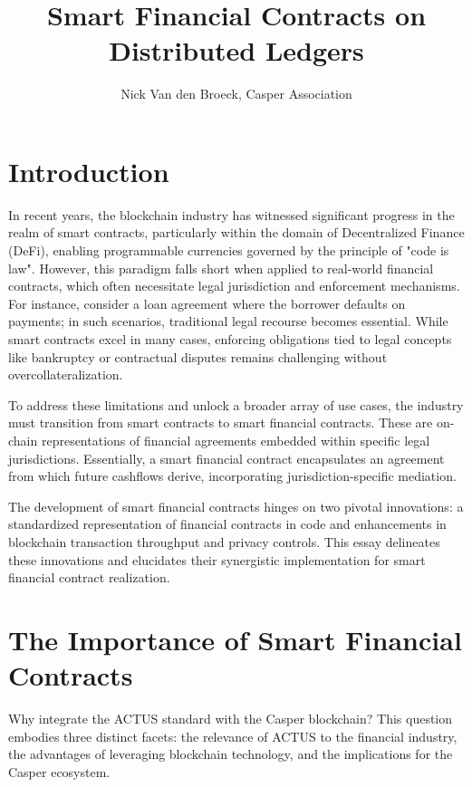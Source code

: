 \documentclass[12pt]{article}
\title{Smart Financial Contracts on Distributed Ledgers}
\author{Nick Van den Broeck, Casper Association}
\begin{document}
\vspace{-1cm}
\maketitle

\tableofcontents
\newpage

\section{Introduction}

In recent years, the blockchain industry has witnessed significant progress in
the realm of smart contracts, particularly within the domain of Decentralized
Finance (DeFi), enabling programmable currencies governed by the principle of
"code is law". However, this paradigm falls short when applied to real-world
financial contracts, which often necessitate legal jurisdiction and enforcement
mechanisms. For instance, consider a loan agreement where the borrower defaults
on payments; in such scenarios, traditional legal recourse becomes essential.
While smart contracts excel in many cases, enforcing obligations tied to legal
concepts like bankruptcy or contractual disputes remains challenging without
overcollateralization.

To address these limitations and unlock a broader array of use cases, the
industry must transition from smart contracts to smart financial contracts.
These are on-chain representations of financial agreements embedded within
specific legal jurisdictions. Essentially, a smart financial contract
encapsulates an agreement from which future cashflows derive, incorporating
jurisdiction-specific mediation.

The development of smart financial contracts hinges on two pivotal innovations:
a standardized representation of financial contracts in code and enhancements in
blockchain transaction throughput and privacy controls. This essay delineates
these innovations and elucidates their synergistic implementation for smart
financial contract realization.

\section{The Importance of Smart Financial Contracts}

Why integrate the ACTUS standard with the Casper blockchain? This question
embodies three distinct facets: the relevance of ACTUS to the financial
industry, the advantages of leveraging blockchain technology, and the
implications for the Casper ecosystem.
\end{document}
